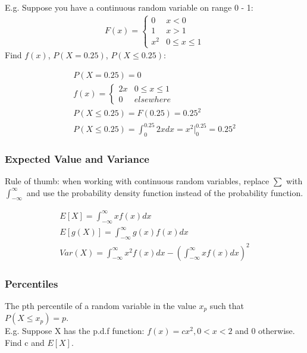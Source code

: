 \documentclass[12pt, letterpaper]{article}
\begin{document}
E.g. Suppose you have a continuous random variable on range 0 - 1:
\begin{align*}
F\left(x\right) =
	\begin{cases} 
      0 & x < 0 \\
      1 & x > 1 \\
      x^2 & 0 \leq x \leq 1
	\end{cases}
\end{align*}
Find $f\left(x\right)$, $P\left(X = 0.25\right)$, $P\left(X \leq 0.25\right)$:

\begin{align*}
P\left(X = 0.25\right) = 0\\
f\left(x\right) = 
	\begin{cases}
	2x & 0 \leq x \leq 1\\
	0 & elsewhere
	\end{cases}\\
P\left(X \leq 0.25\right) = F\left(0.25\right) = 0.25^2\\
P\left(X \leq 0.25\right) = \int_{0}^{0.25} 2x dx = x^2 \vert_{0}^{0.25} = 0.25^2
\end{align*}

\subsubsection{Expected Value and Variance}
Rule of thumb: when working with continuous random variables, replace \(\sum\) with \(\int_{-\infty}^{\infty}\) and use the probability density function instead of the probability function.

\begin{align}
E[X] = \int_{-\infty}^{\infty} x f\left(x\right) dx\\
E[g\left(X\right)] = \int_{-\infty}^{\infty} g\left(x\right) f\left(x\right) dx\\
Var\left(X\right) = \int_{-\infty}^{\infty} x^2 f\left(x\right) dx - \left(\int_{-\infty}^{\infty} x f\left(x\right) dx\right)^2
\end{align}

\subsubsection{Percentiles}
The pth percentile of a random variable in the value \(x_p\) such that \(P\left(X \leq x_p\right) = p\).\\

E.g. Suppose X has the p.d.f function: \(f\left(x\right) = cx^2, 0 < x < 2\) and 0 otherwise. Find c and \(E[X]\).\\
\end{document}
